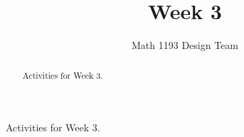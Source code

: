 \documentclass[noauthor]{ximera}
\title{Week 3}
\author{Math 1193 Design Team}
\begin{document}
\begin{abstract}
    Activities for Week 3.
\end{abstract}
\maketitle

Activities for Week 3.
\end{document}
